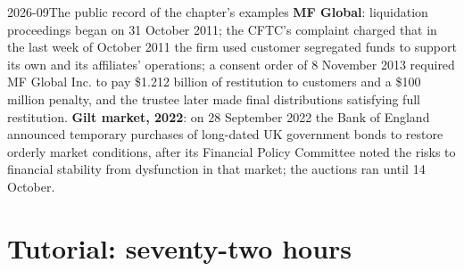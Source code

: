 \begin{dated}{2026-09}{The public record of the chapter's examples}\label{dat:fm:crisis-management:record}
\textbf{MF Global}: liquidation proceedings began on 31 October 2011; the CFTC's complaint charged that in the last week of October 2011 the firm
used customer segregated funds to support its own and its affiliates' operations; a consent order of 8 November 2013 required MF Global Inc. to pay
\$1.212 billion of restitution to customers and a \$100 million penalty, and the trustee later made final distributions satisfying full
restitution. \textbf{Gilt market, 2022}: on 28 September 2022 the Bank of England announced temporary purchases of long-dated UK government bonds
to restore orderly market conditions, after its Financial Policy Committee noted the risks to financial stability from dysfunction in that market;
the auctions ran until 14 October.
\end{dated}

\section{Tutorial: seventy-two hours}\label{tut:fm:crisis-management:tut}

